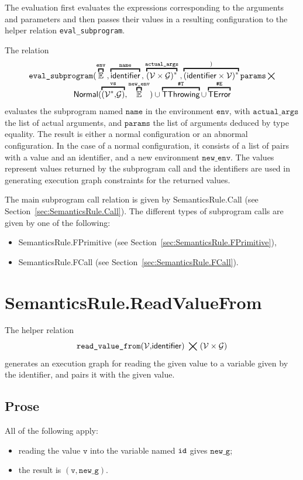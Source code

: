 \documentclass{book}
\newcommand\secref[1]{Section~\ref{sec:#1}}
\newcommand\overname[2]{\overbracket{#1}^{#2}}
\newcommand\XGraphs[0]{\mathcal{G}}
\newcommand\vals[0]{\mathcal{V}}
\newcommand\aslrel[0]{\bigtimes}
\newcommand\aslsep[0]{\mathbf{,}}
\newcommand\ThrowingConfig[0]{\texttt{\#T}}
\newcommand\ErrorConfig[0]{\texttt{\#E}}
\newcommand\TError[0]{\textsf{TError}}
\newcommand\TThrowing[0]{\textsf{TThrowing}}
\newcommand\evalsubprogram[1]{\texttt{eval\_subprogram}(#1)}
\newcommand\Normal[0]{\textsf{Normal}}
\newcommand\newenv[0]{\texttt{new\_env}}
\newcommand\env[0]{\texttt{env}}
\newcommand\newg[0]{\texttt{new\_g}}
\newcommand\vv[0]{\texttt{v}}
\newcommand\vvs[0]{\texttt{vs}}
\newcommand\name[0]{\texttt{name}}
\newcommand\actualargs[0]{\texttt{actual\_args}}
\newcommand\params[0]{\texttt{params}}
\begin{document}
The evaluation first evaluates the expressions corresponding to the arguments
and parameters and then passes their values in a resulting configuration
to the helper relation \texttt{eval\_subprogram}.

The relation
\[
  \begin{array}{c}
    \evalsubprogram{\overname{\envs}{\env} \aslsep
    \overname{\identifier}{\name} \aslsep
    \overname{(\vals \times \XGraphs)^*}{\actualargs} \aslsep
    \overname{(\identifier\times\vals)^*}}{\params} \aslrel \\
    \Normal(\overname{(\vals^* \aslsep \XGraphs)}{\vvs}, \overname{\envs}{\newenv}) \cup
    \overname{\TThrowing}{\ThrowingConfig} \cup
    \overname{\TError}{\ErrorConfig}
  \end{array}
\]
evaluates the subprogram named $\name$ in the environment $\env$, with
$\actualargs$ the list of actual arguments, and $\params$ the
list of arguments deduced by type equality.
The result is either a normal configuration or an abnormal configuration.
In the case of a normal configuration, it consists of a list of pairs
with a value and an identifier, and a new environment $\newenv$.
The values represent values returned by the subprogram call and the
identifiers are used in generating execution graph constraints for the
returned values.

The main subprogram call relation is given by
SemanticsRule.Call (see \secref{SemanticsRule.Call}).
%
The different types of subprogram calls are given by one of the following:
\begin{itemize}
\item SemanticsRule.FPrimitive (see \secref{SemanticsRule.FPrimitive}),
\item SemanticsRule.FCall (see \secref{SemanticsRule.FCall}).
\end{itemize}

\section{SemanticsRule.ReadValueFrom \label{sec:SemanticsRule.ReadValueFrom}}
\newcommand\readvaluefrom[0]{\texttt{read\_value\_from}}
The helper relation
\[
  \readvaluefrom(\vals \aslsep \identifier) \;\aslrel\; (\vals \times \XGraphs)
\]
generates an execution graph for reading the given value to a variable given
by the identifier, and pairs it with the given value.

\subsection{Prose}
All of the following apply:
\begin{itemize}
  \item reading the value $\vv$ into the variable named $\texttt{id}$ gives $\newg$;
  \item the result is $(\vv, \newg)$.
\end{itemize}
\end{document}
